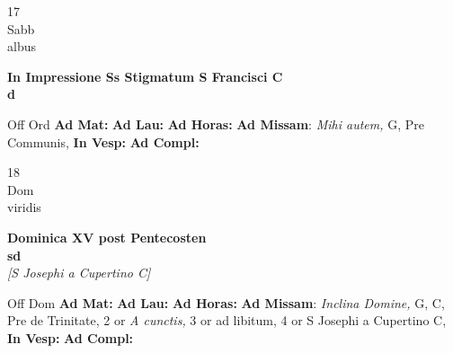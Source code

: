 \documentclass[10pt, openany]{book}
\begin{document}
        \begin{center}
            \begin{minipage}{3.5in}
                \vspace{2em}
                \begin{minipage}{0.5in}
                    {\Huge 17} \\
                    {\normalsize Sabb} \\
                    {\normalsize albus}
                \end{minipage}
                \begin{minipage}{3.0in}
                    \textbf{ \large In Impressione Ss Stigmatum S Francisci C \\
                    \textnormal{\normalsize d}} \\ 
                \end{minipage}
                \begin{justify}Off Ord
                    \textbf{Ad Mat: }
                    \textbf{Ad Lau: }
                    \textbf{Ad Horas: }\textbf{Ad Missam}: \textit{Mihi autem,} G, Pre Communis,  
                    \textbf{In Vesp: }
                    \textbf{Ad Compl: }
                \end{justify}
            \end{minipage}
        \end{center}
    
        \begin{center}
            \begin{minipage}{3.5in}
                \vspace{2em}
                \begin{minipage}{0.5in}
                    {\Huge 18} \\
                    {\normalsize Dom} \\
                    {\normalsize viridis}
                \end{minipage}
                \begin{minipage}{3.0in}
                    \textbf{ \large Dominica XV post Pentecosten \\
                    \textnormal{\normalsize sd}} \\ \textit{[S Josephi a Cupertino C]} \\ 
                \end{minipage}
                \begin{justify}Off Dom
                    \textbf{Ad Mat: }
                    \textbf{Ad Lau: }
                    \textbf{Ad Horas: }\textbf{Ad Missam}: \textit{Inclina Domine,} G, C, Pre de Trinitate, 2 or \textit{A cunctis,} 3 or ad libitum, 4 or S Josephi a Cupertino C,  
                    \textbf{In Vesp: }
                    \textbf{Ad Compl: }
                \end{justify}
            \end{minipage}
        \end{center}
    
\end{document}
